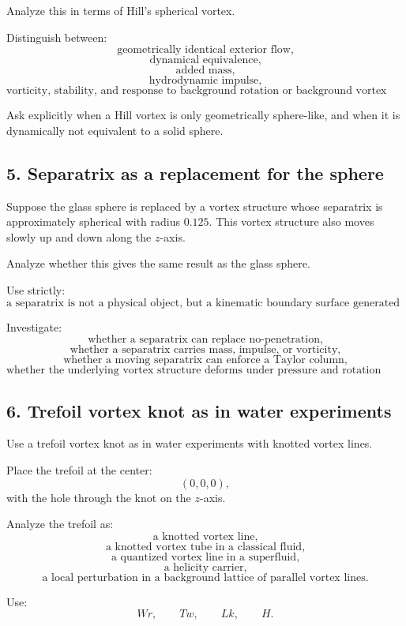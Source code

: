 \documentclass[11pt,a4paper]{article}
\begin{document}
Analyze this in terms of Hill's spherical vortex.

Distinguish between:
\[
\text{geometrically identical exterior flow,}
\]
\[
\text{dynamical equivalence,}
\]
\[
\text{added mass,}
\]
\[
\text{hydrodynamic impulse,}
\]
\[
\text{vorticity, stability, and response to background rotation or background vortex lines.}
\]

Ask explicitly when a Hill vortex is only geometrically sphere-like, and when it is dynamically not equivalent to a solid sphere.

\subsection{5. Separatrix as a replacement for the sphere}

Suppose the glass sphere is replaced by a vortex structure whose separatrix is approximately spherical with radius \(0.125\). This vortex structure also moves slowly up and down along the \(z\)-axis.

Analyze whether this gives the same result as the glass sphere.

Use strictly:
\[
\text{a separatrix is not a physical object, but a kinematic boundary surface generated by the flow.}
\]

Investigate:
\[
\text{whether a separatrix can replace no-penetration,}
\]
\[
\text{whether a separatrix carries mass, impulse, or vorticity,}
\]
\[
\text{whether a moving separatrix can enforce a Taylor column,}
\]
\[
\text{whether the underlying vortex structure deforms under pressure and rotation effects.}
\]

\subsection{6. Trefoil vortex knot as in water experiments}

Use a trefoil vortex knot as in water experiments with knotted vortex lines.

Place the trefoil at the center:
\[
(0,0,0),
\]
with the hole through the knot on the \(z\)-axis.

Analyze the trefoil as:
\[
\text{a knotted vortex line,}
\]
\[
\text{a knotted vortex tube in a classical fluid,}
\]
\[
\text{a quantized vortex line in a superfluid,}
\]
\[
\text{a helicity carrier,}
\]
\[
\text{a local perturbation in a background lattice of parallel vortex lines.}
\]

Use:
\[
Wr,
\qquad
Tw,
\qquad
Lk,
\qquad
H.
\]
\end{document}
